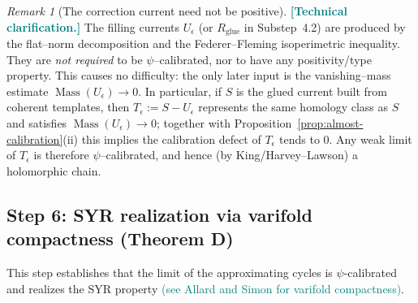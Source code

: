 \documentclass[11pt]{article}
\newcommand{\REVMZ}[1]{\textcolor{teal}{#1}}  %
\numberwithin{equation}{section}  %
\theoremstyle{plain}
\theoremstyle{definition}
\theoremstyle{remark}
\newtheorem{remark}[theorem]{Remark}
\DeclareMathOperator{\Mass}{Mass}
\begin{document}
\begin{remark}[The correction current need not be positive]\label{rem:correction-not-positive}
\REVMZ{\textbf{[Technical clarification.]}}
The filling currents $U_\epsilon$ (or $R_{\mathrm{glue}}$ in Substep~4.2) are produced by the flat--norm decomposition and the Federer--Fleming isoperimetric inequality. They are \emph{not required} to be $\psi$--calibrated, nor to have any positivity/type property. This causes no difficulty: the only later input is the vanishing--mass estimate $\Mass(U_\epsilon)\to 0$. In particular, if $S$ is the glued current built from coherent templates, then $T_\epsilon:=S-U_\epsilon$ represents the same homology class as $S$ and satisfies $\Mass(U_\epsilon)\to 0$; together with Proposition~\ref{prop:almost-calibration}\textnormal{(ii)} this implies the calibration defect of $T_\epsilon$ tends to $0$. Any weak limit of $T_\epsilon$ is therefore $\psi$--calibrated, and hence (by King/Harvey--Lawson) a holomorphic chain.
\end{remark}



\subsection*{Step 6: SYR realization via varifold compactness (Theorem D)}

This step establishes that the limit of the approximating cycles is
$\psi$-calibrated and realizes the SYR property \REVMZ{(see Allard \cite{Allard72} and Simon \cite{Sim83} for varifold compactness)}.
\end{document}
